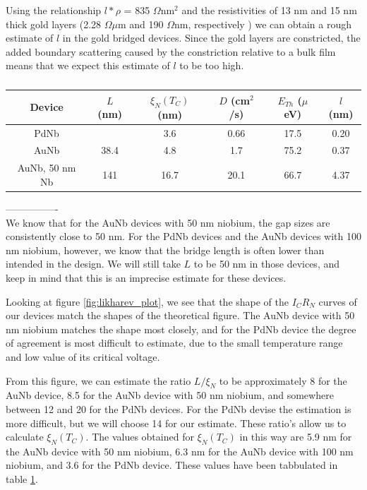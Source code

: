 \iffalse
Using the relationship $l*\rho$ = 835 $\Omega$nm$^2$ \cite{Electron mean free path in elemental metals} and the resistivities of 13 nm and 15 nm thick gold layers (2.28 $\Omega\mu$m and 190 $\Omega$nm, respectively \cite{Electrical resistivity of gold thin ﬁlm as a function of ﬁlm
thickness}) we can obtain a rough estimate of $l$ in the gold bridged devices. Since the gold layers are constricted, the added boundary scattering caused by the constriction relative to a bulk film means that we expect this estimate of $l$ to be too high. 

\begin{table}[H]
\caption{}
\label{tab:likharev_table}
\centering
\begin{tabular}{|c|c|c|c|c|c|}
\hline 
Device & $L$ (nm) & $\xi_N(T_C)$ (nm) & $D$ (cm$^2$/s) & $E_{Th}$ ($\mu$eV) & $l$ (nm) \\ 
\hline 
PdNb & & 3.6 & 0.66 & 17.5 & 0.20 \\ 
\hline 
AuNb & 38.4 & 4.8 & 1.7 & 75.2 & 0.37 \\ 
\hline 
AuNb, 50 nm Nb & 141 & 16.7 & 20.1 & 66.7 & 4.37 \\ 

\hline 
\end{tabular} 

\end{table}

----------------\\
We know that for the AuNb devices with 50 nm niobium, the gap sizes are consistently close to 50 nm. For the PdNb devices and the AuNb devices with 100 nm niobium, however, we know that the bridge length is often lower than intended in the design. We will still take $L$ to be 50 nm in those devices, and keep in mind that this is an imprecise estimate for these devices.

Looking at figure \ref{fig:likharev_plot}, we see that the shape of the $I_CR_N$ curves of our devices match the shapes of the theoretical figure. The AuNb device with 50 nm niobium matches the shape most closely, and for the PdNb device the degree of agreement is most difficult to estimate, due to the small temperature range and low value of its critical voltage.

From this figure, we can estimate the ratio $L/\xi_N$ to be approximately 8 for the AuNb device, 8.5 for the AuNb device with 50 nm niobium, and somewhere between 12 and 20 for the PdNb devices. For the PdNb devise the estimation is more difficult, but we will choose 14 for our estimate. These ratio's allow us to calculate $\xi_N(T_C)$. The values obtained for $\xi_N(T_C)$ in this way are 5.9 nm for the AuNb device with 50 nm niobium, 6.3 nm for the AuNb device with 100 nm niobium, and 3.6 for the PdNb device. These values have been tabbulated in table \ref{tab:likharev_table}.

